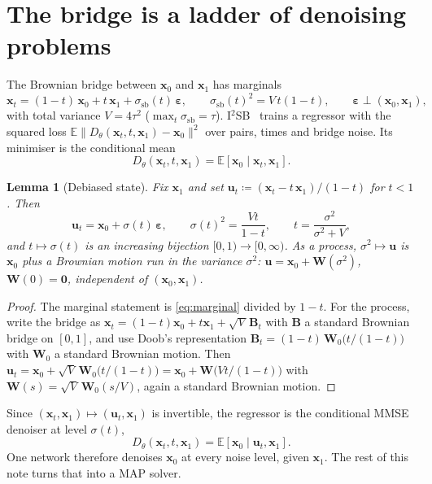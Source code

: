 \documentclass[11pt]{article}
\newtheorem{lemma}[proposition]{Lemma}
\theoremstyle{definition}
\theoremstyle{remark}
\newcommand{\x}{\bm{x}}
\newcommand{\uu}{\bm{u}}
\newcommand{\eps}{\bm{\varepsilon}}
\newcommand{\E}{\mathbb{E}}
\newcommand{\D}{D_\theta}
\newcommand{\ssb}{\sigma_{\mathrm{sb}}}
\begin{document}
\section{The bridge is a ladder of denoising problems}

The Brownian bridge between $\x_0$ and $\x_1$ has marginals
\begin{equation}
  \x_t = (1-t)\,\x_0 + t\,\x_1 + \ssb(t)\,\eps, \qquad \ssb(t)^2 = V\,t(1-t),
  \qquad \eps \perp (\x_0,\x_1),
  \label{eq:marginal}
\end{equation}
with total variance $V = 4\tau^2$ ($\max_t\ssb = \tau$). I$^2$SB~\cite{liu2023} trains a
regressor with the squared loss $\E\|\D(\x_t,t,\x_1) - \x_0\|^2$ over pairs, times and bridge
noise. Its minimiser is the conditional mean
\begin{equation}
  \D(\x_t,t,\x_1) = \E[\x_0\mid\x_t,\x_1].
  \label{eq:mmse}
\end{equation}

\begin{lemma}[Debiased state]\label{lem:debias}
Fix $\x_1$ and set $\uu_t \coloneqq (\x_t - t\,\x_1)/(1-t)$ for $t<1$. Then
\begin{equation}
  \uu_t = \x_0 + \sigma(t)\,\eps,\qquad \sigma(t)^2 = \frac{V t}{1-t},
  \qquad t = \frac{\sigma^2}{\sigma^2 + V},
  \label{eq:debias}
\end{equation}
and $t\mapsto\sigma(t)$ is an increasing bijection $[0,1)\to[0,\infty)$. As a process,
$\sigma^2\mapsto\uu$ is $\x_0$ plus a Brownian motion run in the variance $\sigma^2$:
$\uu = \x_0 + \bm W(\sigma^2)$, $\bm W(0)=\bm0$, independent of $(\x_0,\x_1)$.
\end{lemma}
\begin{proof}
The marginal statement is \eqref{eq:marginal} divided by $1-t$. For the process, write the
bridge as $\x_t = (1-t)\x_0 + t\x_1 + \sqrt V\,\bm B_t$ with $\bm B$ a standard Brownian bridge
on $[0,1]$, and use Doob's representation $\bm B_t = (1-t)\,\bm W_0\big(t/(1-t)\big)$ with
$\bm W_0$ a standard Brownian motion. Then
$\uu_t = \x_0 + \sqrt V\,\bm W_0\big(t/(1-t)\big) = \x_0 + \bm W\big(Vt/(1-t)\big)$ with
$\bm W(s) = \sqrt V\,\bm W_0(s/V)$, again a standard Brownian motion.
\end{proof}

Since $(\x_t,\x_1)\mapsto(\uu_t,\x_1)$ is invertible, the regressor is the conditional MMSE
denoiser at level $\sigma(t)$,
\begin{equation}
  \D(\x_t,t,\x_1) = \E[\x_0\mid\uu_t,\x_1].
  \label{eq:cond_denoiser}
\end{equation}
One network therefore denoises $\x_0$ at every noise level, given $\x_1$. The rest of this
note turns that into a MAP solver.
\end{document}
